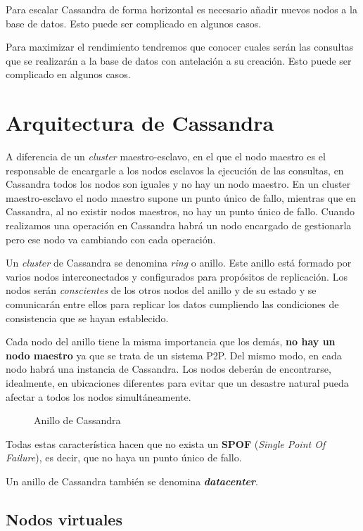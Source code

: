\documentclass[
]{book}
\begin{document}
Para escalar Cassandra de forma horizontal es necesario añadir nuevos nodos a la base de datos. Esto puede ser complicado en algunos casos.

Para maximizar el rendimiento tendremos que conocer cuales serán las consultas que se realizarán a la base de datos con antelación a su creación. Esto puede ser complicado en algunos casos.

\section{Arquitectura de Cassandra}\label{arquitectura-de-cassandra}

A diferencia de un \emph{cluster} maestro-esclavo, en el que el nodo maestro es el responsable de encargarle a los nodos esclavos la ejecución de las consultas, en Cassandra todos los nodos son iguales y no hay un nodo maestro. En un cluster maestro-esclavo el nodo maestro supone un punto único de fallo, mientras que en Cassandra, al no existir nodos maestros, no hay un punto único de fallo. Cuando realizamos una operación en Cassandra habrá un nodo encargado de gestionarla pero ese nodo va cambiando con cada operación.

Un \emph{cluster} de Cassandra se denomina \emph{ring} o anillo. Este anillo está formado por varios nodos interconectados y configurados para propósitos de replicación. Los nodos serán \emph{conscientes} de los otros nodos del anillo y de su estado y se comunicarán entre ellos para replicar los datos cumpliendo las condiciones de consistencia que se hayan establecido.

Cada nodo del anillo tiene la misma importancia que los demás, \textbf{no hay un nodo maestro} ya que se trata de un sistema P2P. Del mismo modo, en cada nodo habrá una instancia de Cassandra. Los nodos deberán de encontrarse, idealmente, en ubicaciones diferentes para evitar que un desastre natural pueda afectar a todos los nodos simultáneamente.

\begin{figure}
\centering

\caption{Anillo de Cassandra}
\end{figure}

Todas estas característica hacen que no exista un \textbf{SPOF} (\emph{Single Point Of Failure}), es decir, que no haya un punto único de fallo.

Un anillo de Cassandra también se denomina \textbf{\emph{datacenter}}.

\subsection{Nodos virtuales}\label{nodos-virtuales}
\end{document}
